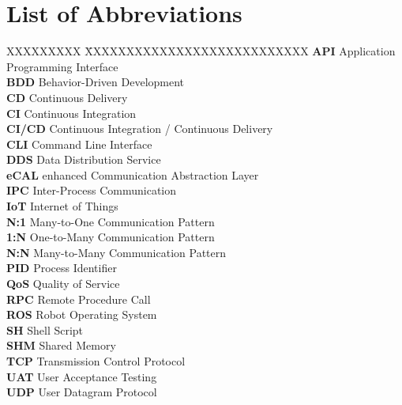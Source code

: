 \documentclass[a4paper,12pt,singlespacing]{article}
\begin{document}
\begingroup
\setlength{\baselineskip}{1.3\baselineskip}
\listoffigures
\endgroup
{}
{}
\pagebreak


\renewcommand{\lstlistlistingname}{List of Listings}
\begingroup
\setlength{\baselineskip}{1.3\baselineskip}
\lstlistoflistings
\endgroup
{}
{}
\pagebreak


\section*{List of Abbreviations}
{}

\begin{tabbing}
	XXXXXXXXX \= XXXXXXXXXXXXXXXXXXXXXXXXXXX \kill %
	\textbf{API} \> Application Programming Interface\\[0.3cm]
	\textbf{BDD} \> Behavior-Driven Development\\[0.3cm]
	\textbf{CD} \> Continuous Delivery\\[0.3cm]
	\textbf{CI} \> Continuous Integration\\[0.3cm]
	\textbf{CI/CD} \> Continuous Integration / Continuous Delivery\\[0.3cm]
	\textbf{CLI} \> Command Line Interface\\[0.3cm]
	\textbf{DDS} \> Data Distribution Service\\[0.3cm]
	\textbf{eCAL} \> enhanced Communication Abstraction Layer\\[0.3cm]
	\textbf{IPC} \> Inter-Process Communication\\[0.3cm]
	\textbf{IoT} \> Internet of Things\\[0.3cm]
	\textbf{N:1} \> Many-to-One Communication Pattern\\[0.3cm]
	\textbf{1:N} \> One-to-Many Communication Pattern\\[0.3cm]
	\textbf{N:N} \> Many-to-Many Communication Pattern\\[0.3cm]
	\textbf{PID} \> Process Identifier\\[0.3cm]
	\textbf{QoS} \> Quality of Service\\[0.3cm]
	\textbf{RPC} \> Remote Procedure Call\\[0.3cm]
	\textbf{ROS} \> Robot Operating System\\[0.3cm]
	\textbf{SH} \> Shell Script\\[0.3cm]
	\textbf{SHM} \> Shared Memory\\[0.3cm]
	\textbf{TCP} \> Transmission Control Protocol\\[0.3cm]
	\textbf{UAT} \> User Acceptance Testing\\[0.3cm]
	\textbf{UDP} \> User Datagram Protocol\\[0.3cm]
\end{tabbing}

\pagebreak
{}
\pagestyle{scrheadings}







\printbibliography[heading=bibintoc]
\end{document}
